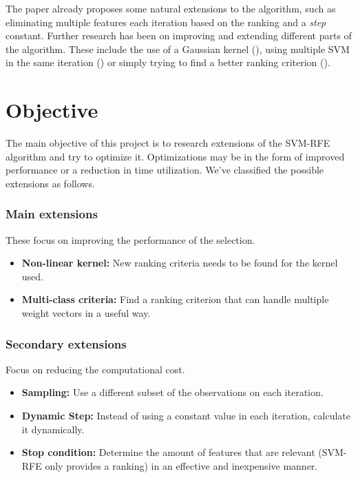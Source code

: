 The paper already proposes some natural extensions to the al\-go\-rithm, such as eliminating multiple features each iteration based on the ranking and a \emph{step} constant. Further research has been on improving and extending different parts of the al\-go\-rithm. These include the use of a Gaussian kernel (\cite{xue_nonlinear_2018}), using multiple SVM in the same iteration (\cite{wang_classification_2011}) or simply trying to find a better ranking criterion (\cite{mundra_svm-rfe_2007}).


\section{Objective}
\label{sec:ch1.objective}

The main objective of this project is to research extensions of the SVM-RFE algorithm and try to optimize it. Optimizations may be in the form of improved performance or a reduction in time utilization. We've classified the possible extensions as follows.

\subsubsection*{Main extensions}

These focus on improving the performance of the selection.

\begin{itemize}
    \item \textbf{Non-linear kernel:} New ranking criteria needs to be found for the kernel used.
    \item \textbf{Multi-class criteria:} Find a ranking criterion that can handle multiple weight vectors in a useful way.
\end{itemize}

\subsubsection*{Secondary extensions}

Focus on reducing the computational cost.

\begin{itemize}
    \item \textbf{Sampling:} Use a different subset of the observations on each iteration.
    \item \textbf{Dynamic Step:} Instead of using a constant value in each iteration, calculate it dynamically.
    \item \textbf{Stop condition:} Determine the amount of features that are relevant (SVM-RFE only provides a ranking) in an effective and inexpensive manner.
\end{itemize}

